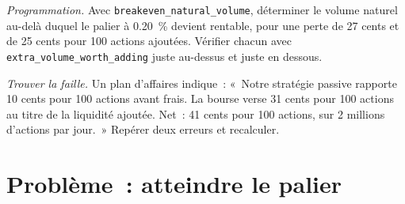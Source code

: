 \begin{exercise}[$\star\star\star$]\label{exo:m1:getting-access-equities:7}
\emph{Programmation.} Avec \texttt{breakeven\_natural\_volume}, déterminer le volume naturel
au-delà duquel le palier à 0.20~\% devient rentable, pour une perte de 27 cents et de 25
cents pour 100 actions ajoutées. Vérifier chacun avec
\texttt{extra\_volume\_worth\_adding} juste au-dessus et juste en dessous.
\end{exercise}

\begin{exercise}[$\star\star\star$]\label{exo:m1:getting-access-equities:8}
\emph{Trouver la faille.} Un plan d'affaires indique~: «~Notre stratégie passive rapporte 10 cents
pour 100 actions avant frais. La bourse verse 31 cents pour 100 actions
au titre de la liquidité ajoutée. Net~: 41 cents pour 100 actions, sur 2 millions d'actions par jour.~»
Repérer deux erreurs et recalculer.
\end{exercise}

\section{Problème~: atteindre le palier}

